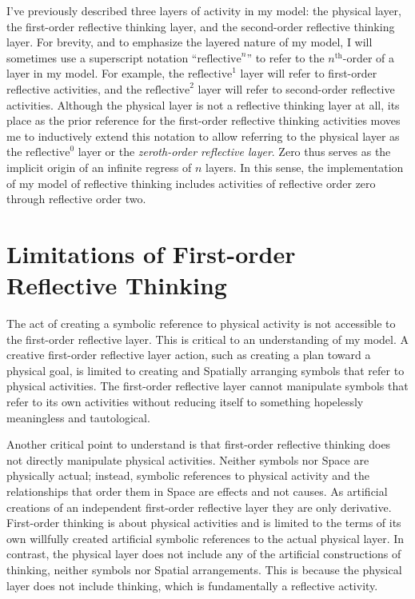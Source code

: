 I've previously described three layers of activity in my model: the
physical layer, the first-order reflective thinking layer, and the
second-order reflective thinking layer.  For brevity, and to emphasize
the layered nature of my model, I will sometimes use a superscript
notation ``$\text{reflective}^n$'' to refer to the $n^\text{th}$-order
of a layer in my model.  For example, the $\text{reflective}^1$ layer
will refer to first-order reflective activities, and the
$\text{reflective}^2$ layer will refer to second-order reflective
activities.  Although the physical layer is not a reflective thinking
layer at all, its place as the prior reference for the first-order
reflective thinking activities moves me to inductively extend this
notation to allow referring to the physical layer as the
$\text{reflective}^0$ layer or the \emph{zeroth-order reflective
  layer}.  Zero thus serves as the implicit origin of an infinite
regress of $n$ layers.  In this sense, the implementation of my model
of reflective thinking includes activities of reflective order zero
through reflective order two.

\section{Limitations of First-order Reflective Thinking}

The act of creating a symbolic reference to physical activity is not
accessible to the first-order reflective layer.  This is critical to
an understanding of my model.  A creative first-order reflective layer
action, such as creating a plan toward a physical goal, is limited to
creating and Spatially arranging symbols that refer to physical
activities.  The first-order reflective layer cannot manipulate
symbols that refer to its own activities without reducing itself to
something hopelessly meaningless and tautological.

Another critical point to understand is that first-order reflective
thinking does not directly manipulate physical activities.  Neither
symbols nor Space are physically actual; instead, symbolic references
to physical activity and the relationships that order them in Space
are effects and not causes.  As artificial creations of an independent
first-order reflective layer they are only derivative.  First-order
thinking is about physical activities and is limited to the terms of
its own willfully created artificial symbolic references to the actual
physical layer.  In contrast, the physical layer does not include any
of the artificial constructions of thinking, neither symbols nor
Spatial arrangements.  This is because the physical layer does not
include thinking, which is fundamentally a reflective activity.

